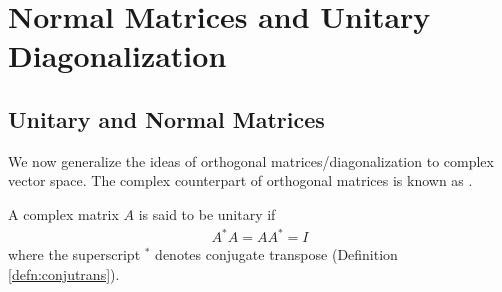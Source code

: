 \section{Normal Matrices and Unitary Diagonalization}

\subsection{Unitary and Normal Matrices} 
We now generalize the ideas of orthogonal matrices/diagonalization to complex vector space. The complex counterpart of orthogonal matrices is known as .
\begin{defn}
\label{defn:unitary}
A complex matrix $A$ is said to be unitary if
\begin{align}
A^*A = AA^* = I
\end{align}
where the superscript $^*$ denotes conjugate transpose (Definition \ref{defn:conjutrans}).
\end{defn}
